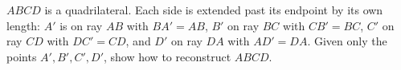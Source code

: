 $ABCD$ is a quadrilateral. Each side is extended past its endpoint by its own length: $A'$ is on ray $AB$ with $BA'=AB$, $B'$ on ray $BC$ with $CB'=BC$, $C'$ on ray $CD$ with $DC'=CD$, and $D'$ on ray $DA$ with $AD'=DA$. Given only the points $A',B',C',D'$, show how to reconstruct $ABCD$.
